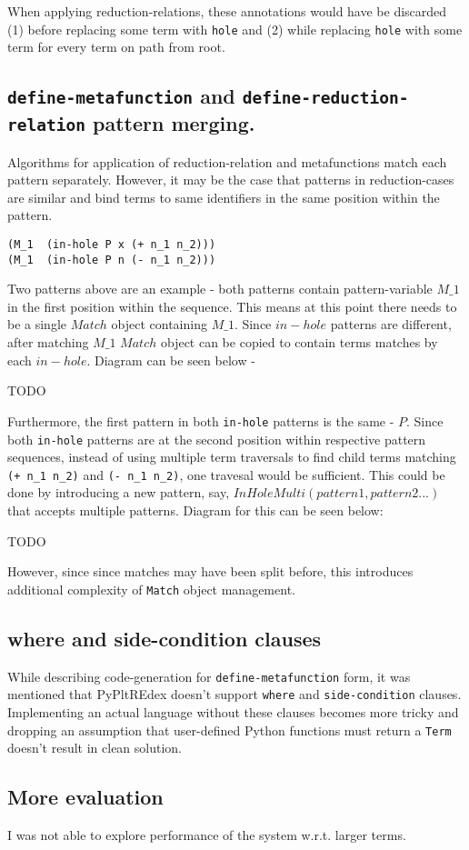When applying reduction-relations, these annotations would have be discarded (1) before replacing some term with \texttt{hole} and (2) while replacing \texttt{hole} with some term for every term on path from root.


\subsection{\texttt{define-metafunction} and \texttt{define-reduction-relation} pattern merging.}

Algorithms for application of reduction-relation and metafunctions match each pattern separately. However, it may be the case that patterns in reduction-cases are similar and bind terms to same identifiers in the same position within the pattern.

\begin{lstlisting}
(M_1  (in-hole P x (+ n_1 n_2)))
(M_1  (in-hole P n (- n_1 n_2)))
\end{lstlisting}

Two patterns above are an example - both patterns contain pattern-variable $M\_1$ in the first position within the sequence. This means at this point there needs to be a single $Match$ object containing $M\_1$. Since $in-hole$ patterns are different, after matching $M\_1$ $Match$ object can be copied to contain terms matches by each $in-hole$. Diagram can be seen below - 

TODO


Furthermore, the first pattern in both \texttt{in-hole} patterns is the same - $P$. Since both \texttt{in-hole} patterns are at the second position within respective pattern sequences, instead of using multiple term traversals to find child terms matching \texttt{(+ n\_1 n\_2)} and \texttt{(- n\_1 n\_2)}, one travesal would be sufficient. This could be done by introducing a new pattern, say, $InHoleMulti(pattern1, pattern2 ...)$ that accepts multiple patterns. Diagram for this can be seen below:

TODO


However, since since matches may have been split before, this introduces additional complexity of \texttt{Match} object management.

\subsection{where and side-condition clauses}
While describing code-generation for \texttt{define-metafunction} form, it was mentioned that PyPltREdex doesn't support \texttt{where} and \texttt{side-condition} clauses. Implementing an actual language without these clauses becomes more tricky and dropping an assumption that user-defined Python functions must return a \texttt{Term} doesn't result in clean solution.

\subsection{More evaluation}

I was not able to explore performance of the system w.r.t. larger terms.


